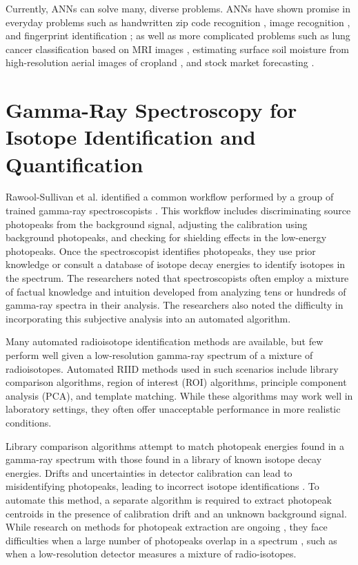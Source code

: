 Currently, ANNs can solve many, diverse problems. ANNs have shown promise in everyday problems such as handwritten zip code recognition \cite{LeCun1989}, image recognition \cite{Krizhevsky2012}, and fingerprint identification \cite{Jeyanthia2015}; as well as more complicated problems such as lung cancer classification based on MRI images \cite{Selvakumari2016}, estimating surface soil moisture from high-resolution aerial images of cropland \cite{Hassan-Esfahani2015}, and stock market forecasting \cite{Rababaah2015}. 


\section{Gamma-Ray Spectroscopy for Isotope Identification and Quantification}

Rawool-Sullivan et al. identified a common workflow performed by a group of trained gamma-ray spectroscopists \cite{RawoolSullivan2010}. This workflow includes discriminating source photopeaks from the background signal, adjusting the calibration using background photopeaks, and checking for shielding effects in the low-energy photopeaks. Once the spectroscopist identifies photopeaks, they use prior knowledge or consult a database of isotope decay energies to identify isotopes in the spectrum. The researchers noted that spectroscopists often employ a mixture of factual knowledge and intuition developed from analyzing tens or hundreds of gamma-ray spectra in their analysis. The researchers also noted the difficulty in incorporating this subjective analysis into an automated algorithm.

Many automated radioisotope identification methods are available, but few perform well given a low-resolution gamma-ray spectrum of a mixture of radioisotopes. Automated RIID methods used in such scenarios include library comparison algorithms, region of interest (ROI) algorithms, principle component analysis (PCA), and template matching. While these algorithms may work well in laboratory settings, they often offer unacceptable performance in more realistic conditions.

Library comparison algorithms attempt to match photopeak energies found in a gamma-ray spectrum with those found in a library of known isotope decay energies. Drifts and uncertainties in detector calibration can lead to misidentifying photopeaks, leading to incorrect isotope identifications \cite{burr2009}. To automate this method, a separate algorithm is required to extract photopeak centroids in the presence of calibration drift and an unknown background signal. While research on methods for photopeak extraction are ongoing \cite{mariscotti1967,DELOTTO1977,GARDNER2011}, they face difficulties when a large number of photopeaks overlap in a spectrum \cite{xiong2015}, such as when a low-resolution detector measures a mixture of radio-isotopes.

